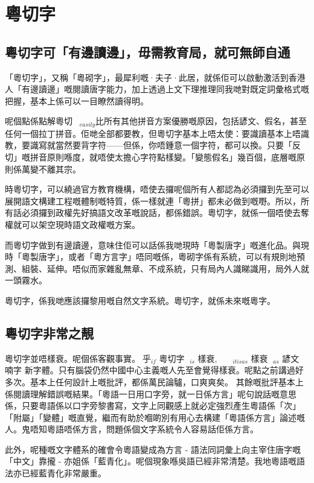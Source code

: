 \chapter{粵切字}

\section{粵切字可「有邊讀邊」，毋需教育局，就可無師自通}

「粵切字」，又稱「粵砌字」，最犀利嘅·夫子·此居，就係佢可以啟動激活到香港人「有邊讀邊」嘅閱讀唐字能力，加上透過上文下理推理同我哋對既定詞彙格式嘅把握，基本上係可以一目瞭然讀得明。

呢個點係點解粵切$_{easily}$比所有其他拼音方案優勝嘅原因，包括諺文、假名，甚至任何一個拉丁拼音。佢哋全部都要教，但粵切字基本上唔太使：要識讀基本上唔識教，要識寫就當然要背字符——但係，你唔鍾意一個字符，都可以換。只要「反切」嘅拼音原則喺度，就唔使太擔心字符點樣變。「變態假名」幾百個，底層嘅原則係萬變不離其宗。

時粵切字，可以繞過官方教育機構，唔使去攞呢個所有人都認為必須攞到先至可以展開語文構建工程嘅體制嘅特質，係一樣就連「粵拼」都未必做到嘅嘢。所以，所有話必須攞到政權先好搞語文改革嘅說話，都係錯誤。粵切字，就係一個唔使去奪權就可以架空現時語文政權嘅方案。

而粵切字做到有邊讀邊，意味住佢可以話係我哋現時「粵製唐字」嘅進化品。與現時「粵製唐字」，或者「粵方言字」唔同嘅係，粵砌字係有系統，可以有規則地預測、組裝、延伸。唔似而家雜亂無章、不成系統，只有局內人識睇識用，局外人就一頭霧水。

粵切字，係我哋應該攞黎用嘅自然文字系統。粵切字，就係未來嘅粵字。

\section{粵切字非常之靚}
粵切字並唔樣衰。呢個係客觀事實。乎$_{if}$ 粵切字 $_{is}$ 樣衰,   $_{it is as}$ 樣衰 $_{as}$ 諺文 喃字 新字體。只有腦袋仍然中國中心主義嘅人先至會覺得樣衰。呢點之前講過好多次。基本上任何設計上嘅批評，都係萬民論驢，口爽爽矣。
其餘嘅批評基本上係閱讀理解錯誤嘅結果。「粵語一日用口字旁，就一日係方言」呢句說話嘅意思係，只要粵語係以口字旁黎書寫，文字上同觀感上就必定強烈產生粵語係「次」「附屬」「變體」嘅直覺，繼而有助於嗰啲別有用心去構建「粵語係方言」論述嘅人。鬼唔知粵語唔係方言，問題係個文字系統令人容易話佢係方言。

此外，呢種嘅文字體系的確會令粵語變成為方言 - 語法同詞彙上向主宰住唐字嘅「中文」靠攏 - 亦姐係「藍青化」。呢個現象喺吳語已經非常清楚。我地粵語嘅語法亦已經藍青化非常嚴重。



